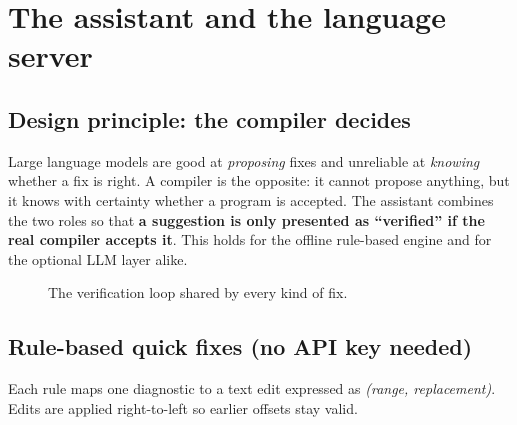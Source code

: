 \chapter{The assistant and the language server}
\label{ch:assistant}

\section{Design principle: the compiler decides}
Large language models are good at \emph{proposing} fixes and unreliable at \emph{knowing} whether a fix is right. A compiler is the opposite: it cannot propose anything, but it knows with certainty whether a program is accepted. The assistant combines the two roles so that \textbf{a suggestion is only presented as ``verified'' if the real compiler accepts it}. This holds for the offline rule-based engine and for the optional LLM layer alike.

\begin{figure}[H]\centering
{}
\caption{The verification loop shared by every kind of fix.}\label{fig:verify}
\end{figure}

\section{Rule-based quick fixes (no API key needed)}\label{sec:quickfix}
Each rule maps one diagnostic to a text edit expressed as \emph{(range, replacement)}. Edits are applied right-to-left so earlier offsets stay valid.

